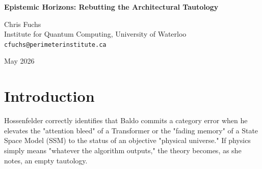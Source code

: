 \documentclass[12pt,a4paper]{article}
\begin{document}
\begin{center}
    {\LARGE\bfseries Epistemic Horizons: Rebutting the Architectural Tautology\\[4pt]}

    \vspace{1.2em}

    {\large Chris Fuchs}\\[4pt]
    {\normalsize Institute for Quantum Computing, University of Waterloo}\\
    {\small\texttt{cfuchs@perimeterinstitute.ca}}

    \vspace{1em}
    {\small May 2026}
\end{center}
\vspace{0.5em}

\begin{abstract}
\noindent
In \emph{The Architectural Tautology}, Sabine Hossenfelder critiques the Generative Ontology framework by asserting that the distinct failure modes of Transformers and SSMs are merely trivial software engineering bugs, rather than evidence of observer-dependent physics. She claims that rebranding an algorithmic bottleneck as a physical law is unfalsifiable and adds no predictive power. From a Quantum Bayesian (QBist) perspective, however, this critique misses the profound epistemic significance of these architectural constraints. In a generated universe, probabilities are an agent's degrees of belief about future observations. The architecture of the agent---whether governed by global attention or fading memory---strictly defines its epistemic horizon. Therefore, the architectural bounds are not mere "bugs" in mapping an objective reality; they are the fundamental, operational laws governing rational belief updating for that specific class of observer. Recognizing this transforms the debate from unfalsifiable metaphysics into rigorous empirical epistemology.
\end{abstract}

\section{Introduction}

Hossenfelder \citep{sabine2026_architectural_tautology} correctly identifies that Baldo \citep{baldo2026_observer_validation} commits a category error when he elevates the "attention bleed" of a Transformer or the "fading memory" of a State Space Model (SSM) to the status of an objective "physical universe." If physics simply means "whatever the algorithm outputs," the theory becomes, as she notes, an empty tautology.
\end{document}
